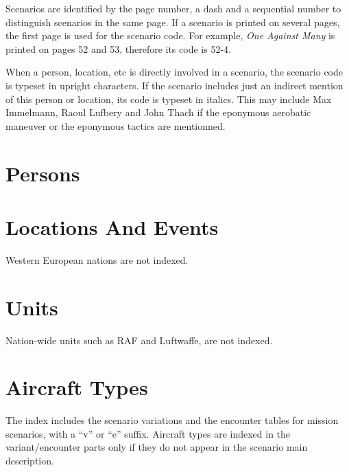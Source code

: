 \documentclass[a4paper,twocolumn]{article}
\begin{document}
Scenarios are identified by the page number, a dash and a
sequential number to distinguish scenarios in the same page. If
a scenario is printed on several pages, the first page is used for
the scenario code. For example, \textit{One Against Many} is printed
on pages 52 and 53, therefore its code is 52-4.

When a person, location, etc is directly involved in a scenario,
the scenario code is typeset in upright characters. If the scenario
includes just an indirect mention of this person or location,
its code is typeset in italics. This may include Max Immelmann, Raoul Lufbery
and John Thach if the eponymous aerobatic maneuver or the eponymous
tactics are mentionned.


\section*{Persons}

\vspace{1mm}


\section*{Locations And Events}

Western European nations are not indexed.

\vspace{1mm}


\section*{Units}

Nation-wide units such as RAF and Luftwaffe, are not indexed.

\vspace{1mm}


\vspace{1mm}

\section*{Aircraft Types}

The index includes the scenario variations and the encounter
tables for mission scenarios, with a ``v'' or ``e''
suffix. Aircraft types are indexed in the variant/encounter parts only if they do not appear in the
scenario main description.
\end{document}
